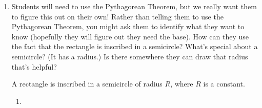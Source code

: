\documentclass{article}
\begin{document}
\begin{enumerate}[resume]
\begin{enumerate}
\begin{solution}
      \textbf{Know:}
      \begin{itemize}
      \item surface area = $2s^2 + 4sh$
      \item volume = $s^2 h$ = 120 cubic inches
      \end{itemize}

      We have the surface area in terms of $s$ and $h$, but we want it
      just in terms of $s$. If we can express $h$ in terms of $s$, 
      then we'll be all set.

      Since $s^2 h = 120$, we can solve to find
      $\displaystyle h = \frac{120}{s^2}$. Plugging this into the
      formula for surface area, we get that the surface area will be
      $\displaystyle 2s^2 + 4s \left(\frac{120}{s^2}\right) = \boxed{2s^2 +
        \frac{480}{s}}$.
    \end{solution} 

  \end{enumerate}

\item \label{gottlieb-1.3.30} %

  \begin{workshop}
    Students will need to use the Pythagorean Theorem, but we really want them to figure this out on their own! Rather than telling them to use the Pythagorean Theorem, you might ask them to identify what they want to know (hopefully they will figure out they need the base). How can they use the fact that the rectangle is inscribed in a semicircle? What's special about a semicircle? (It has a radius.) Is there somewhere they can draw that radius that's helpful?
  \end{workshop}

  A rectangle is inscribed in a semicircle of radius $R$, where $R$ is a constant.


  \begin{enumerate}
  \item \label{gottlieb-1.3.30a}


\end{enumerate}
\end{enumerate}
\end{document}
